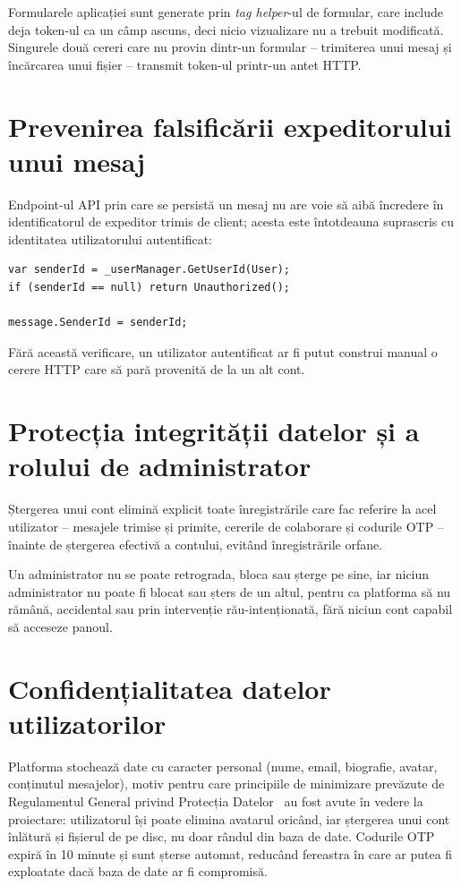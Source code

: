 Formularele aplicației sunt generate prin \emph{tag helper}-ul de formular, care
include deja token-ul ca un câmp ascuns, deci nicio vizualizare nu a trebuit
modificată. Singurele două cereri care nu provin dintr-un formular -- trimiterea
unui mesaj și încărcarea unui fișier -- transmit token-ul printr-un antet HTTP.

\section{Prevenirea falsificării expeditorului unui mesaj}

Endpoint-ul API prin care se persistă un mesaj nu are voie să aibă încredere în
identificatorul de expeditor trimis de client; acesta este întotdeauna suprascris
cu identitatea utilizatorului autentificat:

\begin{lstlisting}[caption={Suprascrierea expeditorului cu identitatea autentificată}]
var senderId = _userManager.GetUserId(User);
if (senderId == null) return Unauthorized();

message.SenderId = senderId;
\end{lstlisting}

Fără această verificare, un utilizator autentificat ar fi putut construi manual
o cerere HTTP care să pară provenită de la un alt cont.

\section{Protecția integrității datelor și a rolului de administrator}

Ștergerea unui cont elimină explicit toate înregistrările care fac referire la
acel utilizator -- mesajele trimise și primite, cererile de colaborare și
codurile OTP -- înainte de ștergerea efectivă a contului, evitând înregistrările
orfane.

Un administrator nu se poate retrograda, bloca sau șterge pe sine, iar niciun
administrator nu poate fi blocat sau șters de un altul, pentru ca platforma să nu
rămână, accidental sau prin intervenție rău-intenționată, fără niciun cont capabil
să acceseze panoul.

\section{Confidențialitatea datelor utilizatorilor}

Platforma stochează date cu caracter personal (nume, email, biografie, avatar,
conținutul mesajelor), motiv pentru care principiile de minimizare prevăzute de
Regulamentul General privind Protecția Datelor~\cite{gdpr} au fost avute în vedere
la proiectare: utilizatorul își poate elimina avatarul oricând, iar ștergerea unui
cont înlătură și fișierul de pe disc, nu doar rândul din baza de date. Codurile OTP
expiră în 10 minute și sunt șterse automat, reducând fereastra în care ar putea fi
exploatate dacă baza de date ar fi compromisă.
